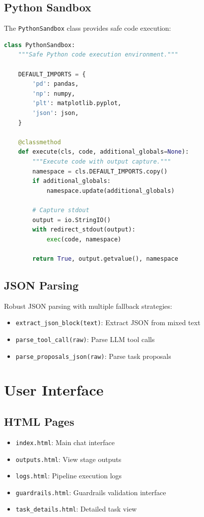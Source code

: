 \documentclass[12pt,a4paper]{report}
\begin{document}
\section{Python Sandbox}
The \texttt{PythonSandbox} class provides safe code execution:
\begin{lstlisting}[language=Python]
class PythonSandbox:
    """Safe Python code execution environment."""
    
    DEFAULT_IMPORTS = {
        'pd': pandas,
        'np': numpy,
        'plt': matplotlib.pyplot,
        'json': json,
    }
    
    @classmethod
    def execute(cls, code, additional_globals=None):
        """Execute code with output capture."""
        namespace = cls.DEFAULT_IMPORTS.copy()
        if additional_globals:
            namespace.update(additional_globals)
        
        # Capture stdout
        output = io.StringIO()
        with redirect_stdout(output):
            exec(code, namespace)
        
        return True, output.getvalue(), namespace
\end{lstlisting}

\section{JSON Parsing}
Robust JSON parsing with multiple fallback strategies:
\begin{itemize}
    \item \texttt{extract\_json\_block(text)}: Extract JSON from mixed text
    \item \texttt{parse\_tool\_call(raw)}: Parse LLM tool calls
    \item \texttt{parse\_proposals\_json(raw)}: Parse task proposals
\end{itemize}

\chapter{User Interface}

\section{HTML Pages}
\begin{itemize}
    \item \texttt{index.html}: Main chat interface
    \item \texttt{outputs.html}: View stage outputs
    \item \texttt{logs.html}: Pipeline execution logs
    \item \texttt{guardrails.html}: Guardrails validation interface
    \item \texttt{task\_details.html}: Detailed task view
\end{itemize}
\end{document}
